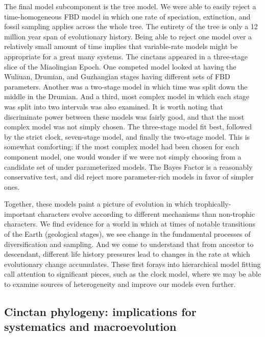 \documentclass{article}
\begin{document}
The final model subcomponent is the tree model.
We were able to easily reject a time-homogeneous FBD model in which one rate of speciation, extinction, and fossil sampling applies across the whole tree.
The entirety of the tree is only a 12 million year span of evolutionary history.
Being able to reject one model over a relatively small amount of time implies that variable-rate models might be appropriate for a great many systems.
The cinctans appeared in a three-stage slice of the Miaolingian Epoch. 
One competed model looked at having the Wuliuan, Drumian, and Guzhangian stages having different sets of FBD parameters. 
Another was  a two-stage model in which time was split down the middle in the Drumian.
And a third, most complex model in which each stage was split into two intervals was also examined. 
It is worth noting that discriminate power between these models was fairly good, and that the most complex model was not simply chosen.
The three-stage model fit best, followed by the strict clock, seven-stage model, and finally the two-stage model. 
This is somewhat comforting: if the most complex model had been chosen for each component model, one would wonder if we were not simply choosing from a candidate set of under parameterized models. 
The Bayes Factor is a reasonably conservative test, and did reject more parameter-rich models in favor of simpler ones.

Together, these models paint a picture of evolution in which trophically-important characters evolve according to different mechanisms than non-trophic characters.
We find evidence for a world in which at times of notable transitions of the Earth (geological stages), we see change in the fundamental processes of diversification and sampling.
And we come to understand that from ancestor to descendant, different life history pressures lead to changes in the rate at which evolutionary change accumulates. 
These first forays into hierarchical model fitting call attention to significant pieces, such as the clock model, where we may be able to examine sources of heterogeneity and improve our models even further.

\subsection{Cinctan phylogeny: implications for systematics and macroevolution}
\end{document}
